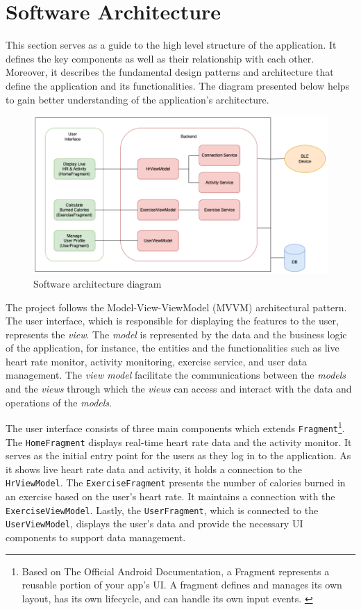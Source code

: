 \section{Software Architecture}
This section serves as a guide to the high level structure of the application. It defines the key components as well as their relationship with each other.
Moreover, it describes the fundamental design patterns and architecture that define the application and its functionalities. 
The diagram presented below helps to gain better understanding of the application's architecture.
\begin{figure}[H]
    \centering
    \includegraphics[width=1\textwidth]{diagrams/architecture-diagram.drawio.png}
    \caption{Software architecture diagram}
    \label{fig:soft_diagram}
\end{figure}
The project follows the Model-View-ViewModel (MVVM) architectural pattern. The user interface, which is responsible for displaying the features to the user, represents the \emph{view}. 
The \emph{model} is represented by the data and the business logic of the application, for instance, the entities and the functionalities such as live heart rate monitor, activity monitoring, exercise service, and user data management. 
The \emph{view model} facilitate the communications between the \emph{models} and the \emph{views} through which the \emph{views} can access and interact with the data and operations of the \emph{models}.

The user interface consists of three main components which extends \texttt{Fragment}\footnote{Based on The Official Android Documentation, a Fragment represents a reusable portion of your app's UI. A fragment defines and manages its own layout, has its own lifecycle, and can handle its own input events. \autocite{android-fragments}}. 
The \texttt{HomeFragment} displays real-time heart rate data and the activity monitor. It serves as the initial entry point for the users as they log in to the application. As it shows live heart rate data and activity, it holds a connection to the \texttt{HrViewModel}.
The \texttt{ExerciseFragment} presents the number of calories burned in an exercise based on the user's heart rate. It maintains a connection with the \texttt{ExerciseViewModel}. Lastly, the \texttt{UserFragment}, which is connected to the \texttt{UserViewModel}, displays the user's data and provide the necessary UI components to support data management.


